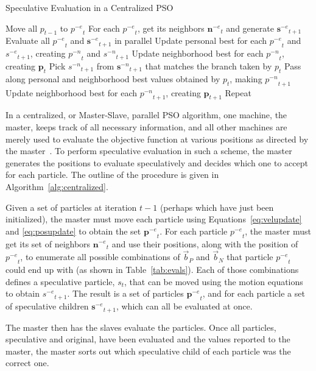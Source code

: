 \documentclass[letterpaper]{sig-alt-release2}
\newcommand{\alg}[1]{Algorithm~\ref{alg:#1}}
\providecommand{\nbest}{\ensuremath{\Vec{b}_N}}
\providecommand{\pbest}{\ensuremath{\Vec{b}_P}}
\providecommand{\noeval}[1]{\ensuremath{#1^{-e}}}
\providecommand{\nonbest}[1]{\ensuremath{#1^{-n}}}
\providecommand{\p}{\ensuremath{p}}
\providecommand{\pset}{\ensuremath{\mathbf{p}}}
\providecommand{\s}{\ensuremath{s}}
\providecommand{\sset}{\ensuremath{\mathbf{s}}}
\providecommand{\nset}{\ensuremath{\mathbf{n}}}
\begin{document}
\begin{algorithm}
  \caption{Speculative Evaluation in a Centralized PSO}
  \label{alg:centralized}
  \begin{algorithmic}[1]
	\STATE Move all $\p_{t-1}$ to $\noeval{\p}_t$
	\STATE For each $\noeval{\p}_t$, get its neighbors $\noeval{\nset}_t$ and
	  generate $\noeval{\sset}_{t+1}$
	\STATE Evaluate all $\noeval{\p}_t$ and $\noeval{\sset}_{t+1}$ in parallel
	\STATE Update personal best for each $\noeval{\p}_t$ and
	  $\noeval{\s}_{t+1}$, creating $\nonbest{\p}_t$ and $\nonbest{\s}_{t+1}$
	\STATE Update neighborhood best for each $\nonbest{\p}_t$, creating
	  $\pset_t$
	\FORALL{$\p_t$}
	\STATE Pick $\nonbest{\s}_{t+1}$ from $\nonbest{\sset}_{t+1}$ that matches
	  the branch taken by $\p_t$
	\STATE Pass along personal and neighborhood best values obtained by $\p_t$,
	  making $\nonbest{\p}_{t+1}$
	\ENDFOR
	\STATE Update neighborhood best for each $\nonbest{\p}_{t+1}$, creating
	  $\pset_{t+1}$
	\STATE Repeat
  \end{algorithmic}
\end{algorithm}

In a centralized, or Master-Slave, parallel PSO algorithm, one machine, the
master, keeps track of all necessary information, and all other machines are
merely used to evaluate the objective function at various positions as directed
by the master~\cite{belal-ijicis04}.  To perform speculative evaluation in such
a scheme, the master generates the positions to evaluate speculatively and
decides which one to accept for each particle.  The outline of the procedure is
given in \alg{centralized}.

Given a set of particles at iteration $t-1$ (perhaps which have just been
initialized), the master must move each particle using
Equations~\eqref{eq:velupdate} and \eqref{eq:posupdate} to obtain the set
$\noeval{\pset}_t$.  For each particle $\noeval{\p}_t$, the master must get its
set of neighbors $\noeval{\nset}_t$ and use their positions, along with the
position of $\noeval{\p}_t$, to enumerate all possible combinations of $\pbest$
and $\nbest$ that particle $\noeval{\p}_t$ could end up with (as shown in
Table~\ref{tab:evals}).  Each of those combinations defines a speculative
particle, $\s_t$, that can be moved using the motion equations to obtain
$\noeval{\s}_{t+1}$.  The result is a set of particles $\noeval{\pset}_t$, and
for each particle a set of speculative children $\noeval{\sset}_{t+1}$, which
can all be evaluated at once.

The master then has the slaves evaluate the particles.  Once all particles,
speculative and original, have been evaluated and the values reported to the
master, the master sorts out which speculative child of each particle was the
correct one.
\end{document}
